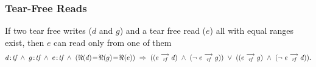      \subsubsection{Tear-Free Reads} 
               If two tear free writes ($d$ and $g$) and a tear free read ($e$) all with equal ranges exist, then $e$ can read only from one of them
                \begin{align*}
                      \et{d}{tf}\ \wedge\ \et{g}{tf} \ \wedge \ \et{e}{tf} 
                        \ \wedge \ 
                        (\Re(d) \!=\! \Re(g) \!=\! \Re(e)) 
                        \ \Rightarrow{} \ 
                            ((\reln{e}{rf}{d}) 
                            \ \wedge \ 
                            (\neg \ \reln{e}{rf}{g})) 
                        \ \vee \  
                            ((\reln{e}{rf}{g}) 
                            \ \wedge \
                            (\neg \ \reln{e}{rf}{d})).
                \end{align*}
                    
